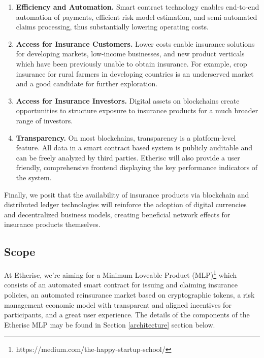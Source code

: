 \documentclass[12pt]{article}
\begin{document}
\begin{enumerate}
    \item \textbf{Efficiency and Automation.} Smart contract technology enables end-to-end automation of payments, efficient risk model estimation, and semi-automated claims processing, thus substantially lowering operating costs.

    \item \textbf{Access for Insurance Customers.} Lower costs enable insurance solutions for developing markets, low-income businesses, and new product verticals which have been previously unable to obtain insurance. For example, crop insurance for rural farmers in developing countries is an underserved market and a good candidate for further exploration.

    \item \textbf{Access for Insurance Investors.} Digital assets on blockchains create opportunities to structure exposure to insurance products for a much broader range of investors. 

    \item \textbf{Transparency.} On most blockchains, transparency is a platform-level feature. All data in a smart contract based system is publicly auditable and can be freely analyzed by third parties. Etherisc will also provide a user friendly, comprehensive frontend displaying the key performance indicators of the system. 
\end{enumerate}

Finally, we posit that the availability of insurance products via blockchain and distributed ledger technologies will reinforce the adoption of digital currencies and decentralized business models, creating beneficial network effects for insurance products themselves.

\subsection{Scope}

At Etherisc, we're aiming for a Minimum Loveable Product (MLP)\footnote{https://medium.com/the-happy-startup-school/} which consists of an automated smart contract for issuing and claiming insurance policies, an automated reinsurance market based on cryptographic tokens, a risk management economic model with transparent and aligned incentives for participants, and a great user experience. The details of the components of the Etherisc MLP may be found in Section \ref{architecture} section below.
\end{document}
